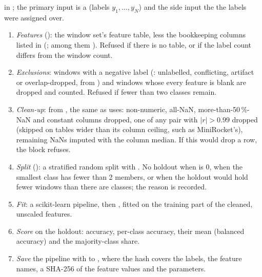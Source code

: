  in ; the primary input is a
 (labels $y_1,\dots,y_N$) and the  side input the
 the labels were assigned over.
\begin{enumerate}
\item \emph{Features} (): the window set's feature table, less the
  bookkeeping columns listed in 
  (; among them ). Refused if there is no
  table, or if the label count differs from the window count.
\item \emph{Exclusions}: windows with a negative label (: unlabelled, conflicting,
  artifact or overlap-dropped, from ) and windows whose
  every feature is blank are dropped and counted. Refused if fewer than two classes remain.
\item \emph{Clean-up}:  from
  , the same as
   uses: non-numeric, all-NaN, more-than-50\,\%-NaN and constant
  columns dropped, one of any pair with $|r| > 0.99$ dropped (skipped on tables wider than its
  column ceiling, such as MiniRocket's), remaining NaNs imputed with the column median. If
  this would drop a row, the block refuses.
\item \emph{Split} (): a stratified random split with
  . No holdout when  is 0, when the smallest class has fewer
  than 2 members, or when the holdout would hold fewer windows than there are classes; the
  reason is recorded.
\item \emph{Fit}: a scikit-learn pipeline,  then
  \citep{breiman2001random}, fitted on the training part of the cleaned, unscaled features.
\item \emph{Score} on the holdout: accuracy, per-class accuracy, their mean (balanced
  accuracy) and the majority-class share.
\item \emph{Save} the pipeline with  to
  , where the hash covers the
  labels, the feature names, a SHA-256 of the feature values and the parameters.
\end{enumerate}

